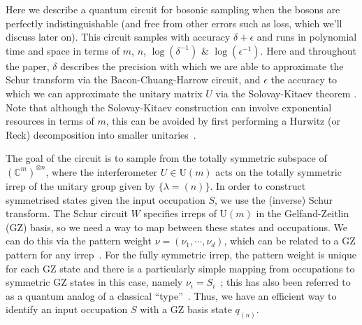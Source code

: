 Here we describe a quantum circuit for bosonic sampling when the bosons are perfectly indistinguishable (and free from other errors such as loss, which we'll discuss later on). 
This circuit samples with accuracy $\delta + \epsilon$ and runs in polynomial time and space in terms of $m$, $n$, $\log(\delta^{-1})$ \& $\log(\epsilon^{-1})$. 
Here and throughout the paper, $\delta$ describes the precision with which we are able to approximate the Schur transform via the Bacon-Chuang-Harrow circuit, and $\epsilon$ the accuracy to which we can approximate the unitary matrix $U$ via the Solovay-Kitaev theorem \cite{nielsen2010,dawson2006}.
Note that although the Solovay-Kitaev construction can involve exponential resources in terms of $m$, this can be avoided by first performing a Hurwitz (or Reck) decomposition into smaller unitaries~\cite{hurwitz1897, reck1994, barenco1995}.

The goal of the circuit is to sample from the totally symmetric subspace of $(\mathbb{C}^m)^{\otimes n}$, where the interferometer $U \in \textrm{U}(m)$ acts on the totally symmetric irrep of the unitary group given by $\{ \lambda = (n)\}$.
In order to construct symmetrised states given the input occupation $S$, we use the (inverse) Schur transform. 
The Schur circuit $W$ specifies irreps of U$(m)$ in the Gelfand-Zeitlin (GZ) basis, so we need a way to map between these states and occupations. 
We can do this via the pattern weight $\nu = (\nu_1,\cdots,\nu_d)$, which can be related to a GZ pattern for any irrep~\cite{alex2011}. 
For the fully symmetric irrep, the pattern weight is unique for each GZ state and there is a particularly simple mapping from occupations to symmetric GZ states in this case, namely $\nu_i = S_i$~\cite{rowe1999}; this has also been referred to as a quantum analog of a classical ``type''~\cite{harrow2005}.
Thus, we have an efficient way to identify an input occupation $S$ with a GZ basis state $q_{(n)}$.

